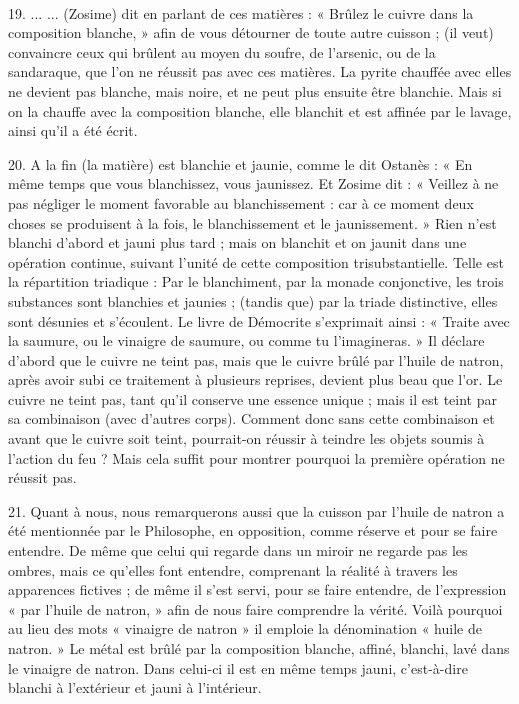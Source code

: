 \documentclass[a4paper, 11pt, oneside, polutonikogreek, french]{article}
\begin{document}
\paragraph{}
19. ... ... (Zosime) dit en parlant de ces matières : « Brûlez le cuivre dans la composition blanche, » afin de vous détourner de toute autre cuisson ; (il veut) convaincre ceux qui brûlent au moyen du soufre, de l'arsenic, ou de la sandaraque, que l'on ne réussit pas avec ces matières. La pyrite chauffée avec elles ne devient pas blanche, mais noire, et ne peut plus ensuite être blanchie. Mais si on la chauffe avec la composition blanche, elle blanchit et est affinée par le lavage, ainsi qu'il a été écrit.

20. A la fin (la matière) est blanchie et jaunie, comme le dit Ostanès : « En même temps que vous blanchissez, vous jaunissez. Et Zosime dit : « Veillez à ne pas négliger le moment favorable au blanchissement : car à ce moment deux choses se produisent à la fois, le blanchissement et le jaunissement. » Rien n'est blanchi d'abord et jauni plus tard ; mais on blanchit et on jaunit dans une opération continue, suivant l'unité de cette composition trisubstantielle. Telle est la répartition triadique : Par le blanchiment, par la monade conjonctive, les trois substances sont blanchies et jaunies ; (tandis que) par la triade distinctive, elles sont désunies et s'écoulent. Le livre de Démocrite s'exprimait ainsi : « Traite avec la saumure, ou le vinaigre de saumure, ou comme tu l'imagineras. » Il déclare d'abord que le cuivre ne teint pas, mais que le cuivre brûlé par l'huile de natron, après avoir subi ce traitement à plusieurs reprises, devient plus beau que l'or. Le cuivre ne teint pas, tant qu'il conserve une essence unique ; mais il est teint par sa combinaison (avec d'autres corps). Comment donc sans cette combinaison et avant que le cuivre soit teint, pourrait-on réussir à teindre les objets soumis à l'action du feu ? Mais cela suffit pour montrer pourquoi la première opération ne réussit pas.

21. Quant à nous, nous remarquerons aussi que la cuisson par l'huile de natron a été mentionnée par le Philosophe, en opposition, comme réserve et pour se faire entendre. De même que celui qui regarde dans un miroir ne regarde pas les ombres, mais ce qu'elles font entendre, comprenant la réalité à travers les apparences fictives ; de même il s'est servi, pour se faire entendre, de l'expression « par l'huile de natron, » afin de nous faire comprendre la vérité. Voilà pourquoi au lieu des mots « vinaigre de natron » il emploie la dénomination « huile de natron. » Le métal est brûlé par la composition blanche, affiné, blanchi, lavé dans le vinaigre de natron. Dans celui-ci il est en même temps jauni, c'est-à-dire blanchi à l'extérieur et jauni à l'intérieur.
\end{document}
